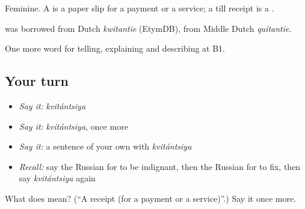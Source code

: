 Feminine. A \emph{} is a paper slip for a payment or a service; a till receipt is a \emph{}.

\begin{cousinweb}
\emph{} was borrowed from Dutch \emph{kwitantie} (EtymDB), from Middle Dutch \emph{quitantie}.
\end{cousinweb}

\begin{grammarlens}[title={What you've built}]
One more word for telling, explaining and describing at B1.
\end{grammarlens}

\subsection*{Your turn}
\begin{itemize}
\raggedright
  \item \emph{Say it:} \emph{kvitántsiya}
  \item \emph{Say it:} \emph{kvitántsiya}, once more
  \item \emph{Say it:} a sentence of your own with \emph{kvitántsiya}
  \item \emph{Recall:} say the Russian for to be indignant, then the Russian for to fix, then say \emph{kvitántsiya} again
\end{itemize}

\begin{tcolorbox}[breakable,colback=teal!4,colframe=teal!35!black,title={Before you move on}]
What does  mean? (\textquotedblleft{}A receipt (for a payment or a service)\textquotedblright{}.) Say it once more.
\end{tcolorbox}
